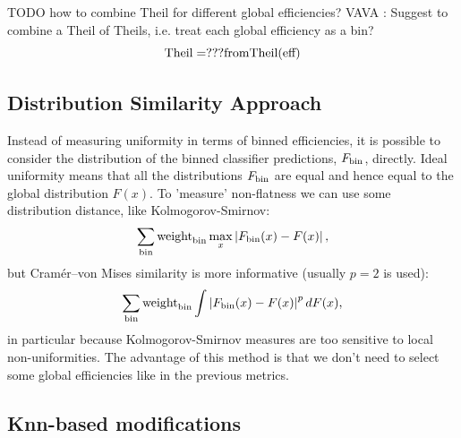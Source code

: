 TODO how to combine Theil for different global efficiencies?
VAVA : Suggest to combine a Theil of Theils, i.e. treat each global efficiency as a bin?
\[
	\text{Theil} = ??? \text{from} \text{Theil}(\text{eff})
\]

\subsection{Distribution Similarity Approach}
\label{sec:similarity}

Instead of measuring uniformity in terms of binned efficiencies, it is possible to consider the distribution of
the binned classifier predictions, $F_{\text{bin}}$, directly.
Ideal uniformity means that all the distributions $F_{\text{bin}}$ are equal and hence equal to the global distribution $F(x)$. 
To 'measure' non-flatness we can use some distribution distance, like Kolmogorov-Smirnov:
\[
	 \sum_{\text{bin}} \text{weight}_\text{bin} \max_x \left\vert F_{\text{bin}}(x) - F(x)\right\vert,
\]
but Cram\'er--von Mises similarity is more informative (usually $p=2$ is used):
\[
	 \sum_{\text{bin}} \text{weight}_\text{bin} \int \left\vert F_{\text{bin}}(x) - F(x)\right\vert^p dF(x),
\]
in particular because Kolmogorov-Smirnov measures are too sensitive to local non-uniformities.
The advantage of this method is that we don't need to select some global efficiencies like in the previous metrics.
%
%

\subsection{Knn-based modifications}

